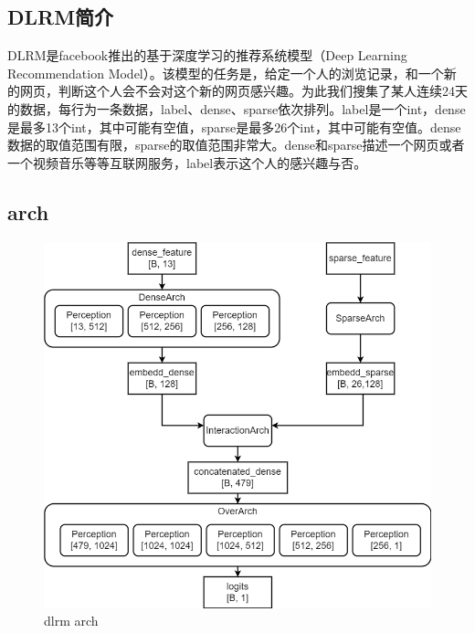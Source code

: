 \documentclass{article}
\begin{document}
\subsection{DLRM简介}
DLRM是facebook推出的基于深度学习的推荐系统模型（Deep Learning Recommendation Model）。该模型的任务是，给定一个人的浏览记录，和一个新的网页，判断这个人会不会对这个新的网页感兴趣。为此我们搜集了某人连续24天的数据，每行为一条数据，label、dense、sparse依次排列。label是一个int，dense是最多13个int，其中可能有空值，sparse是最多26个int，其中可能有空值。dense数据的取值范围有限，sparse的取值范围非常大。dense和sparse描述一个网页或者一个视频音乐等等互联网服务，label表示这个人的感兴趣与否。

\subsection{arch}
\begin{figure}[H]
    \centering
    \includegraphics[scale=0.4]{dlrm2_arch.png}
    \caption{dlrm arch}
\end{figure}
\end{document}
